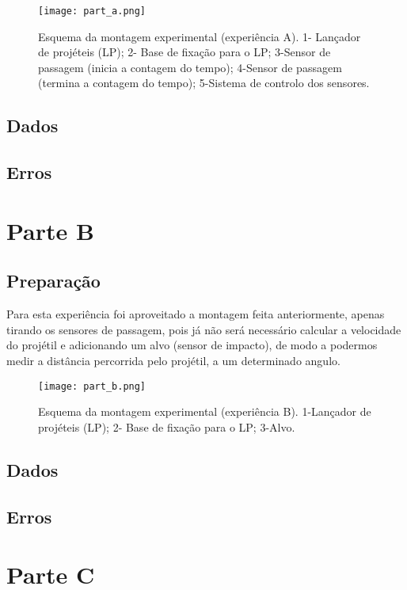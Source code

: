 \documentclass{report}
\begin{document}
\begin{figure}
	\centering
	\texttt{[image: part\_a.png]}
	\caption{Esquema da montagem experimental (experiência A). 1- Lançador de projéteis (LP); 2-
	Base de fixação para o LP; 3-Sensor de passagem (inicia a contagem do tempo); 4-Sensor de
	passagem (termina a contagem do tempo); 5-Sistema de controlo dos sensores.}
	\label{fig:parteA}
\end{figure}

\section{Dados}

\section{Erros}

\chapter{Parte B}

\section{Preparação}

	Para esta experiência foi aproveitado a montagem feita anteriormente, apenas tirando
	os sensores de passagem, pois já não será necessário calcular a velocidade do projétil 
	e adicionando um alvo (sensor de impacto), de modo a podermos medir a distância percorrida 
	pelo projétil, a um determinado angulo.

\begin{figure}
	\centering
	\texttt{[image: part\_b.png]}
	\caption{Esquema da montagem experimental (experiência B). 1-Lançador de projéteis (LP); 2-
	Base de fixação para o LP; 3-Alvo.}
\end{figure}

\section{Dados}

\section{Erros}

\chapter{Parte C}
\end{document}
